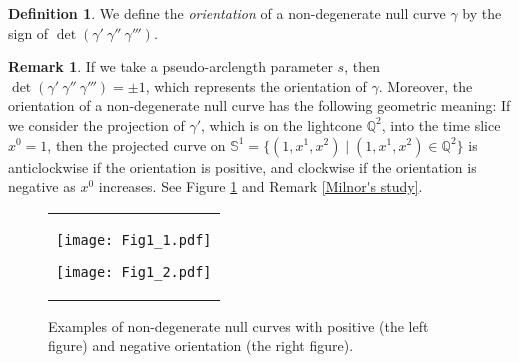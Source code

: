 \documentclass[11pt,reqno]{amsart}
\theoremstyle{plain} %
\theoremstyle{definition}
\newtheorem{definition}[theorem]{Definition}
\newtheorem{remark}[theorem]{Remark}
\begin{document}
\begin{definition}\label{ori}
We define the {\it orientation} of a non-degenerate null curve $\gamma$ by the sign of $\det\left(\gamma'\ \gamma''\ \gamma'''\right)$.
\end{definition}
\begin{remark}\label{remark:ori}
If we take a pseudo-arclength parameter $s$, then $\det\left(\gamma'\ \gamma''\ \gamma'''\right)=\pm1$, which represents the orientation of $\gamma$. 
Moreover, the orientation of a non-degenerate null curve has the following geometric meaning: If we consider the projection of $\gamma'$, which is on the lightcone $\mathbb{Q}^2$, into the time slice $x^0=1$, then the projected curve on $\mathbb{S}^1= \{(1,x^1,x^2) \mid (1,x^1,x^2)\in \mathbb{Q}^2\}$ is anticlockwise if the orientation is positive, and clockwise if the orientation is negative as $x^0$ increases. See Figure \ref{Fig1} and Remark \ref{Milnor's study}. 

\begin{figure}[!h]
\begin{center}
\begin{tabular}{c}
\hspace{+2.0cm}
\begin{minipage}{0.4\hsize}
\begin{center}
\vspace{-0.8cm}
\texttt{[image: Fig1\_1.pdf]}
\vspace{0.5cm}
\end{center}
\end{minipage}
\hspace{0.3cm}
\begin{minipage}{0.4\hsize}
\begin{center}
\vspace{-0.45cm}
\texttt{[image: Fig1\_2.pdf]}
\vspace{0.3cm}
\end{center}
\end{minipage}

\end{tabular}
\end{center}
\vspace{-0.8cm}
\caption{Examples of non-degenerate null curves with positive (the left figure) and negative orientation (the right figure).}\label{Fig1}

\end{figure}
\end{remark}
\end{document}
